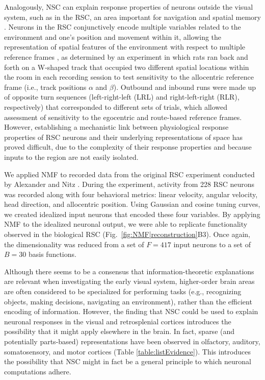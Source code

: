 Analogously, \ac{NSC} can explain response properties
of neurons outside the visual system, 
such as in the \acf{RSC}, an area important for navigation and spatial memory \cite{Miller2014,Nelson2015,VannAggleton2009}.
Neurons in the \ac{RSC} conjunctively encode multiple variables related to 
the environment and one's position and movement within it,
allowing the representation of spatial features of the environment 
with respect to multiple reference frames \cite{AlexanderNitz2015}, as determined by an experiment in which rats ran back and forth on a W-shaped track that occupied two different spatial locations within the room in each recording session to test sensitivity to the allocentric reference frame (i.e., track positions $\alpha$ and $\beta$). Outbound and inbound runs were made up of opposite turn sequences (left-right-left (LRL) and right-left-right (RLR), respectively) that corresponded to different sets of trials, which allowed assessment of sensitivity to the egocentric and route-based reference frames. However, establishing a mechanistic link 
between physiological response properties of \ac{RSC} neurons 
and their underlying representations of space
has proved difficult,
due to the complexity of their response properties and because inputs to the region are not easily isolated.

We applied NMF to recorded data from the original \ac{RSC} experiment conducted by
Alexander and Nitz \citep{AlexanderNitz2015}. During the experiment, activity from 228 \ac{RSC} neurons 
was recorded along with four behavioral metrics: linear velocity, angular velocity, head direction, and allocentric position. Using Gaussian and cosine tuning curves, we created idealized input neurons that encoded these four variables. 
By applying \ac{NMF} to the idealized neuronal output, we were able to replicate
functionality observed in the biological \ac{RSC} (Fig.~\ref{fig:NMF|reconstruction}B3).
Once again, the dimensionality was reduced from a set of $F = 417$ input neurons to a set of $B = 30$ basis functions.

Although there seems to be a consensus that information-theoretic explanations are relevant when investigating the early visual system,
higher-order brain areas are often considered to be specialized for
performing tasks
(e.g., recognizing objects, making decisions, navigating an environment),
rather than the efficient encoding of information.
However, the finding that \ac{NSC} could be used to explain
neuronal responses in the visual and retrosplenial cortices
introduces the possibility that it might apply elsewhere in the brain.
In fact, sparse
(and potentially parts-based)
representations have been observed in 
olfactory, auditory, somatosensory, 
and motor cortices
(Table \ref{table:listEvidence}). 
This introduces the possibility that \ac{NSC} might in fact
be a general principle to which neuronal computations adhere.

